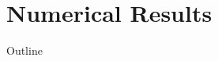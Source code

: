 \documentclass[10pt,xcolor=dvipsnames,compress]{beamer}
\begin{document}






\section{Numerical Results}
\begin{frame}{Outline}
    \tableofcontents[currentsection]
\end{frame}

\end{document}
